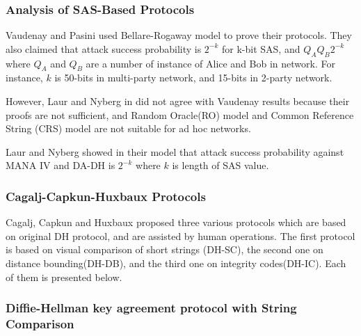 \subsubsection*{Analysis of SAS-Based Protocols}

Vaudenay and Pasini used Bellare-Rogaway model to prove their protocols. They also claimed that attack success probability is $2^{-k}$ for k-bit SAS, and $Q_A Q_B 2^{-k}$ where $Q_A$ and $Q_B$ are a number of instance of Alice and Bob in network. For instance, $k$ is 50-bits in multi-party network, and 15-bits in 2-party network.

However, Laur and Nyberg in \cite{Laur:2006kl} did not agree with Vaudenay results because their proofs are not sufficient, and Random Oracle(RO) model and Common Reference String (CRS) model are not suitable for ad hoc networks.

Laur and Nyberg showed in their model that attack success probability against MANA IV and DA-DH is $2^ {-k}$ where $k$ is length of SAS value.

\subsubsection{Cagalj-Capkun-Huxbaux Protocols}

Cagalj, Capkun and Huxbaux \cite{1580514} proposed three various protocols which are based on original DH protocol, and are assisted by human operations. The first protocol is based on visual comparison of short strings (DH-SC), the second one on distance bounding(DH-DB), and the third one on integrity codes(DH-IC). Each of them is presented below. 
 
\subsubsection*{Diffie-Hellman key agreement protocol with String Comparison}

